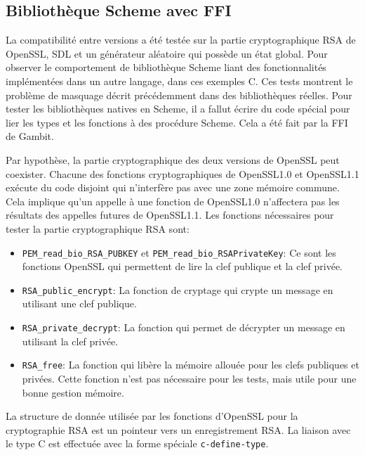 

\clearpage
%
\subsection{Bibliothèque Scheme avec FFI}
%
La compatibilité entre versions a été testée sur la partie cryptographique RSA
de OpenSSL, SDL et un générateur aléatoire qui possède un état global.  Pour
observer le comportement de bibliothèque Scheme liant des fonctionnalités
implémentées dans un autre langage, dans ces exemples C. Ces tests montrent le
problème de masquage décrit précédemment dans des bibliothèques réelles.  Pour
tester les bibliothèques natives en Scheme, il a fallut écrire du code spécial
pour lier les types et les fonctions à des procédure Scheme. Cela a été fait
par la FFI de Gambit.

Par hypothèse, la partie cryptographique des deux versions de OpenSSL peut
coexister. Chacune des fonctions cryptographiques de OpenSSL1.0 et OpenSSL1.1
exécute du code disjoint qui n'interfère pas avec une zone mémoire commune.
Cela implique qu'un appelle à une fonction de OpenSSL1.0 n'affectera pas les
résultats des appelles futures de OpenSSL1.1. Les fonctions nécessaires
pour tester la partie cryptographique RSA sont:
\begin{itemize}
    \item \lstinline{PEM_read_bio_RSA_PUBKEY} et \lstinline{PEM_read_bio_RSAPrivateKey}:
        Ce sont les fonctions OpenSSL qui permettent de lire la clef publique et la clef privée.
    \item \lstinline{RSA_public_encrypt}:
        La fonction de cryptage qui crypte un  message en utilisant une clef publique.
    \item \lstinline{RSA_private_decrypt}:
        La fonction qui permet de décrypter un message en utilisant la clef privée.
    \item \lstinline{RSA_free}:
        La fonction qui libère la mémoire allouée pour les clefs publiques et privées.
        Cette fonction n'est pas nécessaire pour les tests, mais utile pour une bonne
        gestion mémoire.
\end{itemize}
La structure de donnée utilisée par les fonctions d'OpenSSL pour la cryptographie RSA
est un pointeur vers un enregistrement RSA. La liaison avec le type C est effectuée avec
la forme spéciale \lstinline{c-define-type}.

